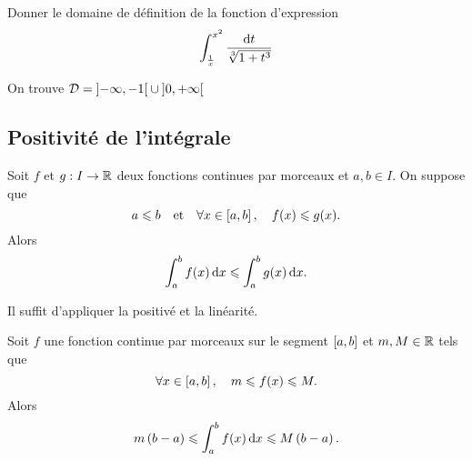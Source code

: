 \documentclass{magnolia}
\begin{document}
\begin{exoUnique}
\exo[utile=2] Donner le domaine de définition de la fonction d'expression
  \[\integinv{\frac{1}{x}}{x^2}{\sqrt[3]{1+t^3}}{t}\]
  \begin{sol}
  On trouve $\mathcal{D}=\intero{-\infty}{-1}\cup\intero{0}{+\infty}$
  \end{sol}
\end{exoUnique}

\subsection{Positivité de l'intégrale}

\begin{proposition}[nom={Croissance de l'intégrale}]
Soit $f$ et $g:I\to\R$ deux fonctions continues par morceaux et $a,b\in I$. On suppose que
\[a\leq b \quad\text{et}\quad \forall x\in\interf{a}{b} \qsep f(x)\leq g(x).\]
Alors
\[\integ{a}{b}{f(x)}{x}\leq\integ{a}{b}{g(x)}{x}.\]
\end{proposition}

\begin{preuve}
Il suffit d'appliquer la positivé et la linéarité.
\end{preuve}

\begin{remarqueUnique}
\remarque[utile=-2] Soit $f$ une fonction continue par morceaux sur le segment
  $\interf{a}{b}$ et $m,M\in\R$ tels que
  \[\forall x\in\interf{a}{b}\qsep m\leq f(x)\leq M.\]
  Alors
  \[m\p{b-a}\leq\integ{a}{b}{f(x)}{x}\leq M\p{b-a}.\]
\end{remarqueUnique}
\end{document}
